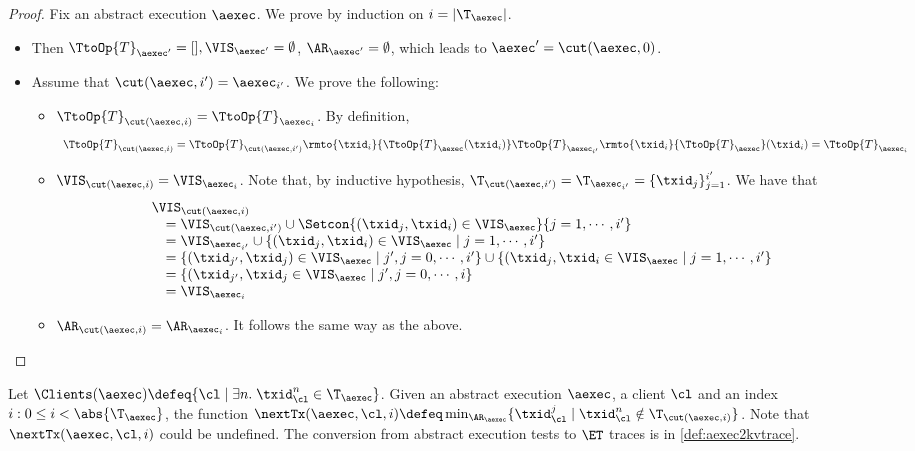 \begin{proof}
Fix an abstract execution $\aexec$. We prove by induction on $i = \lvert \T_{\aexec} \rvert$.
\begin{itemize}
\item {} Then $\TtoOp{T}_{\aexec'} = [], \VIS_{\aexec'} = \emptyset$, 
$\AR_{\aexec'} = \emptyset$, which leads to $\aexec' = \cut(\aexec, 0)$. 
\item {} 
Assume that $\cut(\aexec, i') = \aexec_{i'}$. 
We prove the following: 
\begin{itemize}
\item $\TtoOp{T}_{\cut(\aexec, i)} = \TtoOp{T}_{\aexec_i}$. 
By definition, 
\[
    \begin{array}{l}
\TtoOp{T}_{\cut(\aexec,i)} = \TtoOp{T}_{\cut(\aexec, i')}\rmto{\txid_{i}}{\TtoOp{T}_{\aexec}(\txid_{i})} 
\TtoOp{T}_{\aexec_{i'}}\rmto{\txid_{i}}{\TtoOp{T}_{\aexec}}(\txid_{i}) = \TtoOp{T}_{\aexec_{i}}
\end{array}
\]
\item $\VIS_{\cut(\aexec, i)} = \VIS_{\aexec_{i}}$. 
Note that, by inductive hypothesis, $\T_{\cut(\aexec, i')} = \T_{\aexec_{i'}} = \{\txid_{j}\}_{j=1}^{i'}$. 
We have that  
\[
\begin{array}{l}
    \VIS_{\cut(\aexec, i)} \\
    \quad = \VIS_{\cut(\aexec, i')} \cup \Setcon{(\txid_j, \txid_{i}) \in \VIS_{\aexec} }{ j = 1,\cdots, i'} \\ 
    \quad = \VIS_{\aexec_{i'}} \cup \{(\txid_{j}, \txid_{i}) \in \VIS_{\aexec} \mid j=1,\cdots, i'\} \\ 
    \quad = \{(\txid_{j'}, \txid_{j}) \in \VIS_{\aexec} \mid j', j = 0,\cdots, i'\} \cup \{(\txid_{j}, \txid_{i} \in \VIS_{\aexec} \mid j=1,\cdots, i'\} \\
    \quad = \{(\txid_{j'}, \txid_{j} \in \VIS_{\aexec} \mid j',j = 0,\cdots, i\} \\
    \quad = \VIS_{\aexec_{i}}
\end{array}
\]
\item $\AR_{\cut(\aexec, i)} = \AR_{\aexec_{i}}$. It follows the same way 
as the above. 
\end{itemize}
\end{itemize}
\end{proof}

Let $\Clients(\aexec) \defeq \{\cl \mid \exists n.\;\txid_{\cl}^{n} \in \T_{\aexec}\}$.
Given an abstract execution $\aexec$, a client $\cl$ and an index $i : 0 \leq i < \abs{\T_\aexec}$,
the function $\nextTx(\aexec, \cl, i) \defeq \min_{\AR_{\aexec}}\{\txid_{\cl}^{j} \mid \txid_{\cl}^{n} \notin \T_{\cut(\aexec, i)}\}$. 
Note that $\nextTx(\aexec, \cl, i)$ could be undefined. 
The conversion from abstract execution tests to \( \ET \) traces is in \cref{def:aexec2kvtrace}.

